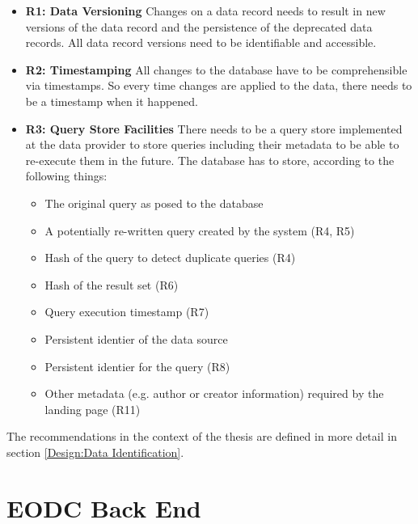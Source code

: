 \documentclass[draft,final]{vutinfth} %
\begin{document}
\begin{itemize}
	\item \textbf{R1: Data Versioning} 
	Changes on a data record needs to result in new versions of the data record and the persistence of the deprecated data records. All data record versions need to be identifiable and accessible. 
	\item \textbf{R2: Timestamping} 
	All changes to the database have to be comprehensible via timestamps. So every time changes are applied to the data, there needs to be a timestamp when it happened. 
	\item \textbf{R3: Query Store Facilities} 
	There needs to be a query store implemented at the data provider to store queries including their metadata to be able to re-execute them in the future. The database has to store, according to \cite{rauber2016identification} the following things: 
	\begin{itemize}
		\item The original query as posed to the database
		\item A potentially re-written query created by the system (R4, R5)
		\item Hash of the query to detect duplicate queries (R4)
		\item Hash of the result set (R6)
		\item Query execution timestamp (R7)
		\item Persistent identier of the data source
		\item Persistent identier for the query (R8)
		\item Other metadata (e.g. author or creator information) required by the landing page (R11)
	\end{itemize}
	
\end{itemize}

 The recommendations in the context of the thesis are defined in more detail in section \ref{Design:Data Identification}. 

\section{EODC Back End}\label{EODC Back End}
 
\end{document}
